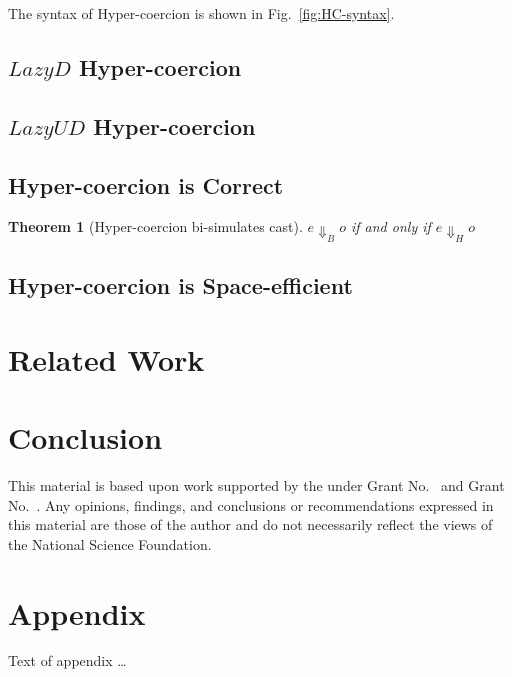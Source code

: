 \documentclass[acmsmall,review,anonymous]{acmart}\settopmatter{printfolios=true,printccs=false,printacmref=false}
\newtheorem{theorem}{Theorem}[section]
\newcommand{\figref}[1]{Fig.~\ref{#1}}
\begin{document}
The syntax of Hyper-coercion is shown in \figref{fig:HC-syntax}.

\subsection{$Lazy D$ Hyper-coercion}

\subsection{$Lazy UD$ Hyper-coercion}

\subsection{Hyper-coercion is Correct}

\begin{theorem}[Hyper-coercion bi-simulates cast]	
	$ e \Downarrow_B o $ if and only if $ e \Downarrow_H o $
\end{theorem}

\subsection{Hyper-coercion is Space-efficient}

\section{Related Work}

\section{Conclusion}

\begin{acks}                            %
  This material is based upon work supported by the
   under Grant
  No.~ and Grant
  No.~.  Any opinions, findings, and
  conclusions or recommendations expressed in this material are those
  of the author and do not necessarily reflect the views of the
  National Science Foundation.
\end{acks}





\appendix
\section{Appendix}

Text of appendix \ldots
\end{document}
